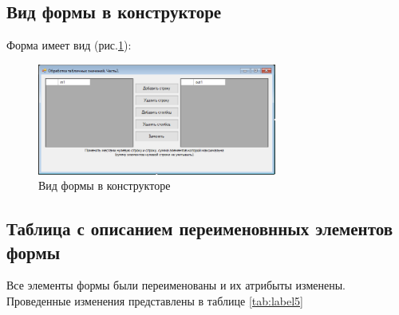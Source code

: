 \subsection{Вид формы в конструкторе}

Форма имеет вид (рис.\ref{fig:FormInConstruct5}):

\begin{figure}[!h]
    \centering
    \includegraphics[width = 0.7\textwidth]{images/Task5/FormInConstructor.png}
    \caption{Вид формы в конструкторе}
    \label{fig:FormInConstruct5}
\end{figure}

\subsection{Таблица с описанием переименовнных элементов формы}

Все элементы формы были переименованы и их атрибыты изменены. Проведенные изменения представлены в таблице \ref{tab:label5}

